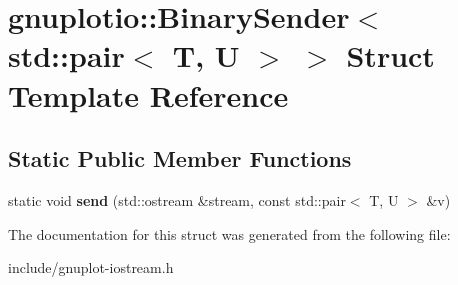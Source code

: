 \hypertarget{structgnuplotio_1_1BinarySender_3_01std_1_1pair_3_01T_00_01U_01_4_01_4}{}\section{gnuplotio\+:\+:Binary\+Sender$<$ std\+:\+:pair$<$ T, U $>$ $>$ Struct Template Reference}
\label{structgnuplotio_1_1BinarySender_3_01std_1_1pair_3_01T_00_01U_01_4_01_4}
\subsection*{Static Public Member Functions}
\begin{DoxyCompactItemize}
\item 
\mbox{\label{structgnuplotio_1_1BinarySender_3_01std_1_1pair_3_01T_00_01U_01_4_01_4_a9d949c8e7b1dea493288b0a2dd95cbff}} 
static void {\bfseries send} (std\+::ostream \&stream, const std\+::pair$<$ T, U $>$ \&v)
\end{DoxyCompactItemize}


The documentation for this struct was generated from the following file\+:\begin{DoxyCompactItemize}
\item 
include/gnuplot-\/iostream.\+h\end{DoxyCompactItemize}
